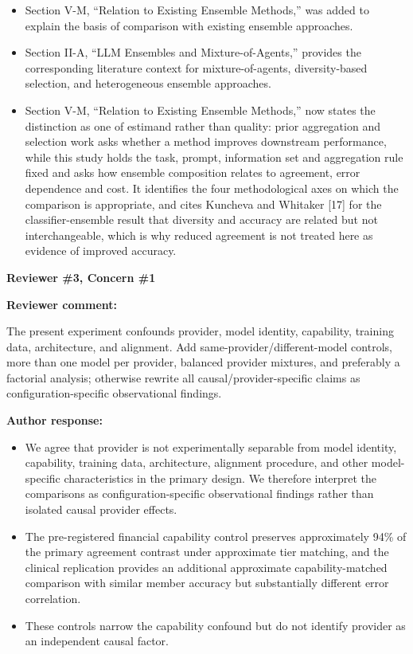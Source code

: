 \documentclass[11pt]{article}
\newcommand{\rvcomment}[1]{{\color{ReviewerGreen}#1}}
\newcommand{\concern}[1]{\textbf{\color{ReviewerGreen}#1}}
\begin{document}
\begin{itemize}

\item Section V-M, ``Relation to Existing Ensemble Methods,'' was added to explain the basis of comparison with existing ensemble approaches.

\item Section II-A, ``LLM Ensembles and Mixture-of-Agents,'' provides the corresponding literature context for mixture-of-agents, diversity-based selection, and heterogeneous ensemble approaches.

\item Section V-M, ``Relation to Existing Ensemble Methods,'' now states the distinction as one of estimand rather than quality: prior aggregation and selection work asks whether a method improves downstream performance, while this study holds the task, prompt, information set and aggregation rule fixed and asks how ensemble composition relates to agreement, error dependence and cost. It identifies the four methodological axes on which the comparison is appropriate, and cites Kuncheva and Whitaker [17] for the classifier-ensemble result that diversity and accuracy are related but not interchangeable, which is why reduced agreement is not treated here as evidence of improved accuracy.

\end{itemize}

\vspace{12pt}
\concern{Reviewer \#3, Concern \#1}

\concern{Reviewer comment:}

\rvcomment{The present experiment confounds provider, model identity, capability, training data, architecture, and alignment. Add same-provider/different-model controls, more than one model per provider, balanced provider mixtures, and preferably a factorial analysis; otherwise rewrite all causal/provider-specific claims as configuration-specific observational findings.}

\textbf{Author response:}

\begin{itemize}

\item We agree that provider is not experimentally separable from model identity, capability, training data, architecture, alignment procedure, and other model-specific characteristics in the primary design. We therefore interpret the comparisons as configuration-specific observational findings rather than isolated causal provider effects.

\item The pre-registered financial capability control preserves approximately 94\% of the primary agreement contrast under approximate tier matching, and the clinical replication provides an additional approximate capability-matched comparison with similar member accuracy but substantially different error correlation.

\item These controls narrow the capability confound but do not identify provider as an independent causal factor.

\end{itemize}
\end{document}
